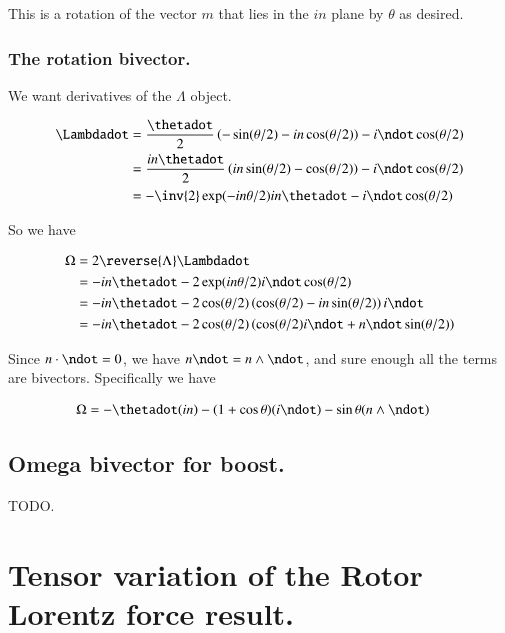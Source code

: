 This is a rotation of the vector $m$ that lies in the $i n$ plane by $\theta$ as desired.

\subsubsection{The rotation bivector. }

We want derivatives of the $\Lambda$ object.

\begin{align*}
\Lambdadot 
&= \frac{\thetadot}{2} \left( -\sin( \theta/ 2 ) - i n \cos( \theta/ 2 ) \right) - i \ndot \cos(\theta/2) \\
&= \frac{i n \thetadot}{2} \left( i n \sin( \theta/ 2 ) - \cos( \theta/ 2 ) \right) - i \ndot \cos(\theta/2) \\
&= -\inv{2} \exp( -i n \theta/2 ) {i n \thetadot} - i \ndot \cos(\theta/2) \\
\end{align*}

So we have

\begin{align*}
\Omega 
&= 2 \reverse{\Lambda} \Lambdadot \\
&= -{i n \thetadot} - 2 \exp(i n \theta/2) i \ndot \cos(\theta/2) \\
&= -{i n \thetadot} - 2 \cos(\theta/2) \left( \cos(\theta/2) - i n \sin(\theta/2)  \right) i \ndot \\
&= -{i n \thetadot} - 2 \cos(\theta/2) \left( \cos(\theta/2) i \ndot + n \ndot \sin(\theta/2)  \right) \\
\end{align*}

Since $n \cdot \ndot = 0$, we have $n \ndot = n \wedge \ndot$, and sure enough all the terms are bivectors.  Specifically
we have

\begin{align*}
\Omega 
&= -\thetadot(i n) - (1 + \cos\theta ) (i \ndot) - \sin\theta (n \wedge \ndot)
\end{align*}

\subsection{Omega bivector for boost. }

TODO.

\section{Tensor variation of the Rotor Lorentz force result. }

